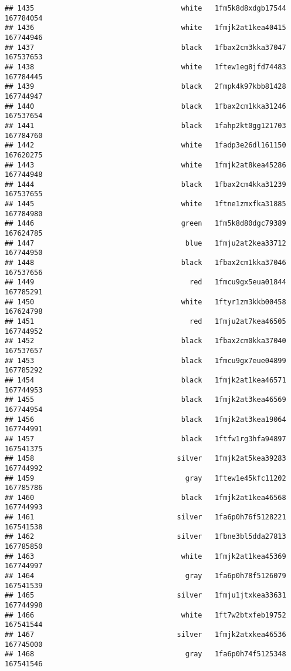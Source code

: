 \documentclass[
]{article}
\begin{document}
\begin{verbatim}
## 1435                                   white   1fm5k8d8xdgb17544 167784054
## 1436                                   white   1fmjk2at1kea40415 167744946
## 1437                                   black   1fbax2cm3kka37047 167537653
## 1438                                   white   1ftew1eg8jfd74483 167784445
## 1439                                   black   2fmpk4k97kbb81428 167744947
## 1440                                   black   1fbax2cm1kka31246 167537654
## 1441                                   black   1fahp2kt0gg121703 167784760
## 1442                                   white   1fadp3e26dl161150 167620275
## 1443                                   white   1fmjk2at8kea45286 167744948
## 1444                                   black   1fbax2cm4kka31239 167537655
## 1445                                   white   1ftne1zmxfka31885 167784980
## 1446                                   green   1fm5k8d80dgc79389 167624785
## 1447                                    blue   1fmju2at2kea33712 167744950
## 1448                                   black   1fbax2cm1kka37046 167537656
## 1449                                     red   1fmcu9gx5eua01844 167785291
## 1450                                   white   1ftyr1zm3kkb00458 167624798
## 1451                                     red   1fmju2at7kea46505 167744952
## 1452                                   black   1fbax2cm0kka37040 167537657
## 1453                                   black   1fmcu9gx7eue04899 167785292
## 1454                                   black   1fmjk2at1kea46571 167744953
## 1455                                   black   1fmjk2at3kea46569 167744954
## 1456                                   black   1fmjk2at3kea19064 167744991
## 1457                                   black   1ftfw1rg3hfa94897 167541375
## 1458                                  silver   1fmjk2at5kea39283 167744992
## 1459                                    gray   1ftew1e45kfc11202 167785786
## 1460                                   black   1fmjk2at1kea46568 167744993
## 1461                                  silver   1fa6p0h76f5128221 167541538
## 1462                                  silver   1fbne3bl5dda27813 167785850
## 1463                                   white   1fmjk2at1kea45369 167744997
## 1464                                    gray   1fa6p0h78f5126079 167541539
## 1465                                  silver   1fmju1jtxkea33631 167744998
## 1466                                   white   1ft7w2btxfeb19752 167541544
## 1467                                  silver   1fmjk2atxkea46536 167745000
## 1468                                    gray   1fa6p0h74f5125348 167541546

\end{verbatim}
\end{document}

